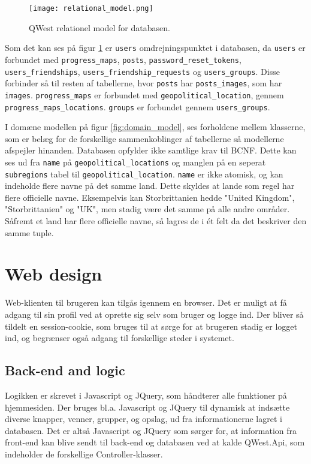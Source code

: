\begin{figure}
    \texttt{[image: relational\_model.png]}
    \caption{QWest relationel model for databasen.}
    \label{fig:relational_model}
\end{figure}

Som det kan ses på figur \ref{fig:relational_model} er \texttt{users} omdrejningspunktet i databasen, da \texttt{users} er forbundet med \texttt{progress\_maps}, \texttt{posts}, \texttt{password\_reset\_tokens}, \texttt{users\_friendships}, \texttt{users\_friendship\_requests} og \texttt{users\_groups}. Disse forbinder så til resten af tabellerne, hvor \texttt{posts} har \texttt{posts\_images}, som har \texttt{images}. \texttt{progress\_maps} er forbundet med \texttt{geopolitical\_location}, gennem \texttt{progress\_maps\_locations}. \texttt{groups} er forbundet gennem \texttt{users\_groups}.

I domæne modellen på figur \ref{fig:domain_model}, ses forholdene mellem klasserne, som er belæg for de forskellige sammenkoblinger af tabellerne så modellerne afspejler hinanden. Databasen opfylder ikke samtlige krav til BCNF\cite{bcnf}. Dette kan ses ud fra \texttt{name} på \texttt{geopolitical\_locations} og manglen på en seperat \texttt{subregions} tabel til \texttt{geopolitical\_location}. \texttt{name} er ikke atomisk, og kan indeholde flere navne på det samme land. Dette skyldes at lande som regel har flere officielle navne. Eksempelvis kan Storbrittanien hedde "United Kingdom", "Storbrittanien" og "UK", men stadig være det samme på alle andre områder. Såfremt et land har flere officielle navne, så lagres de i ét felt da det beskriver den samme tuple.

\section{Web design}\label{sec:webdesignArc}
Web-klienten til brugeren kan tilgås igennem en browser. Det er muligt at få adgang til sin profil ved at oprette sig selv som bruger og logge ind. Der bliver så tildelt en session-cookie, som bruges til at sørge for at brugeren stadig er logget ind, og begrænser også adgang til forskellige steder i systemet.

\subsection{Back-end and logic}\label{sec:backendArc}
Logikken er skrevet i Javascript og JQuery, som håndterer alle funktioner på hjemmesiden. Der bruges bl.a. Javascript og JQuery til dynamisk at indsætte diverse knapper, venner, grupper, og opslag, ud fra informationerne lagret i databasen. Det er altså Javascript og JQuery som sørger for, at information fra front-end kan blive sendt til back-end og databasen ved at kalde QWest.Api, som indeholder de forskellige Controller-klasser.


